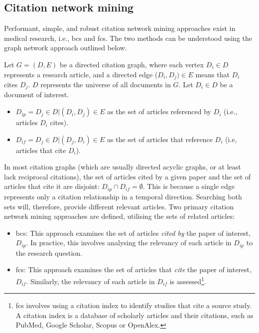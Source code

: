 \documentclass[10pt,oneside]{book}
\begin{document}
\subsection{Citation network mining}

Performant, simple, and robust citation network mining approaches exist in medical research, i.e., \gls*{bcs} and \gls*{fcs}. The two methods can be understood using the graph network approach outlined below.

\begin{tcolorbox}[title=Citation Network Definitions] 
\small
Let $G = (D, E)$ be a directed citation graph, where each vertex $D_i \in D$ represents a research article, and a directed edge ($D_i, D_j) \in E$ means that $D_i$ cites $D_j$. $D$ represents the universe of all documents in $G$. Let $D_i \in D$ be a document of interest. 

\begin{itemize}
    \item $D_{ip} = {D_j \in D | (D_i, D_j) \in E}$ as the set of articles referenced by $D_i$ (i.e., articles $D_i$ cites). 
    \item $D_{if} = {D_j \in D | (D_j, D_i) \in E}$ as the set of articles that reference $D_i$ (i.e, articles that cite $D_i$).

\end{itemize}

In most citation graphs (which are usually directed acyclic graphs, or at least lack reciprocal citations), the set of articles cited by a given paper and the set of articles that cite it are disjoint: $D_{ip} \cap D_{if} = \emptyset$. This is because a single edge represents only a citation relationship in a temporal direction. Searching both sets will, therefore, provide different relevant articles.
\newline
\newline
Two primary citation network mining approaches are defined, utilising the sets of related articles:

\begin{itemize}
    \item \gls*{bcs}:  This approach examines the set of articles \emph{cited by} the paper of interest, $D_{ip}$.  In practice, this involves analysing the relevancy of each article in $D_{ip}$ to the research question. \cite{lefebvre_cochrane_2011, akers2009systematic}
    \item \gls*{fcs}: This approach examines the set of articles that \emph{cite} the paper of interest, $D_{if}$.  Similarly, the relevancy of each article in $D_{if}$ is assessed\footnote{\gls*{fcs} involves using a citation index to identify studies that cite a source study. A citation index is a database of scholarly articles and their citations, such as PubMed, Google Scholar, Scopus or OpenAlex.}.
\end{itemize}

\end{tcolorbox}
\end{document}
